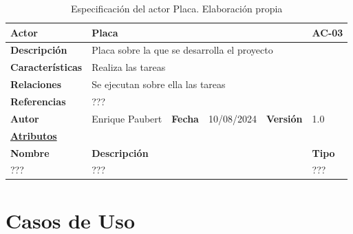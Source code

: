 \begin{table}[H]
    \begin{tabular}{|llllll|}
	\hline
	\multicolumn{1}{|l|}{\textbf{Actor}}		& \multicolumn{4}{l|}{Placa} & AC-03		\\ \hline
	\multicolumn{1}{|l|}{\textbf{Descripción}}     	& \multicolumn{5}{l|}{Placa sobre la que se desarrolla el proyecto}	\\ \hline
	\multicolumn{1}{|l|}{\textbf{Características}}	& \multicolumn{5}{l|}{Realiza las tareas}	\\ \hline
	\multicolumn{1}{|l|}{\textbf{Relaciones}}		& \multicolumn{5}{l|}{Se ejecutan sobre ella las tareas}	\\ \hline
	\multicolumn{1}{|l|}{\textbf{Referencias}}     	& \multicolumn{5}{l|}{???}	\\ \hline
	\multicolumn{1}{|l|}{\textbf{Autor}}           	& \multicolumn{1}{l|}{Enrique Paubert}        & \multicolumn{1}{l|}{\textbf{Fecha}}        & \multicolumn{1}{l|}{10/08/2024}        & \multicolumn{1}{l|}{\textbf{Versión}}       & 1.0                   \\ \hline
	\multicolumn{6}{|l|}{\textbf{\underline{Atributos}}} \\ \hline %
	\multicolumn{1}{|l|}{\textbf{Nombre}}		& \multicolumn{4}{l|}{\textbf{Descripción}} &  \textbf{Tipo}  \\ \hline
	\multicolumn{1}{|l|}{ ??? }				& \multicolumn{4}{l|}{ ??? }  & ???	\\ \hline
    \end{tabular}
    \caption[Actor: Placa]{Especificación del actor Placa. Elaboración propia}
\end{table}

\section{Casos de Uso}


